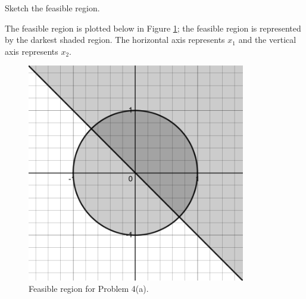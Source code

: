 Sketch the feasible region.

\begin{solution}
    The feasible region is plotted below in Figure \ref{fig:problem_4a}; the feasible
    region is represented by the darkest shaded region. The horizontal axis represents $x_1$ and the vertical axis 
    represents $x_2$.

    \begin{figure}[h]
        \centering
        \includegraphics*[width=0.85\textwidth]{problem_4a.png}
        \caption{Feasible region for Problem 4(a).}
        \label{fig:problem_4a}
    \end{figure}
\end{solution}